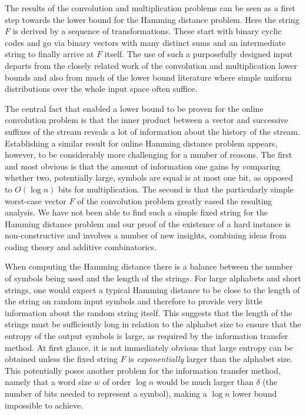 \documentclass{toc}
\begin{document}
The results of the convolution and multiplication problems can be seen as a first step towards the lower bound for the Hamming distance problem.
Here the string $F$ is derived by a sequence of transformations. These start with binary cyclic codes and go via binary vectors with many 
distinct sums and an intermediate string to finally arrive at $F$ itself.
The use of such a purposefully designed input departs from the closely related work of the convolution and multiplication lower bounds and also from much of the lower bound literature where simple uniform distributions over the whole input space often suffice.
%

The central fact that enabled a lower bound to be proven for the online convolution problem is that the inner product  between a vector and successive suffixes of the stream reveals a lot of information about the history of the stream.  Establishing a similar result for online Hamming distance problem appears, however, to be considerably more challenging for a number of reasons.
The first and most obvious is that the amount of information one gains by comparing whether two, potentially large, symbols are equal is at most one bit, as opposed to $O(\log{n})$ bits for multiplication.
The second is that the particularly simple worst-case vector $F$ of the convolution problem greatly eased the resulting analysis.
We have not been able to find such a simple fixed string for the Hamming distance problem and our proof of the existence of a hard instance is non-constructive and involves a number of new insights, combining ideas from coding theory and additive combinatorics.

When computing the Hamming distance there is a balance between the number of symbols being used and the length of the strings. For large alphabets and short strings, one would expect a typical %
 Hamming distance to be close to the length of the string on random input symbols and therefore to provide very little information about the random string itself.
This suggests that the length of the strings must be sufficiently long in relation to the alphabet size to ensure that the entropy of the output symbols is large, as required by the information transfer method. At first glance, it is not immediately obvious that large entropy can be obtained unless the fixed string $F$ is \emph{exponentially} larger than the alphabet size. This potentially poses another problem for the information transfer method, namely that a word size $w$ of order $\log n$ would be much larger than $\delta$ (the number of bits needed to represent a symbol), making a $\log n$ lower bound impossible to achieve.
%
%
\end{document}
